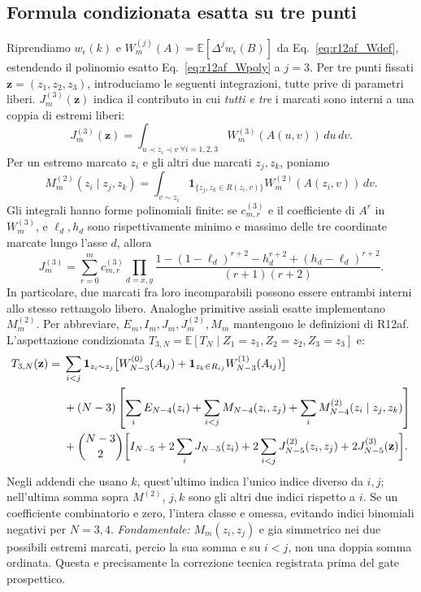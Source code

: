\documentclass[11pt,a4paper]{article}
\begin{document}
\subsection{Formula condizionata esatta su tre punti}

Riprendiamo $w_\epsilon(k)$ e $W_m^{(j)}(A)=\mathbb E[\Delta^jw_\epsilon(B)]$ da Eq.~\eqref{eq:r12af_Wdef}, estendendo il polinomio esatto Eq.~\eqref{eq:r12af_Wpoly} a $j=3$. Per tre punti fissati $\mathbf z=(z_1,z_2,z_3)$, introduciamo le seguenti integrazioni, tutte prive di parametri liberi. $J_m^{(3)}(\mathbf z)$ indica il contributo in cui \emph{tutti e tre} i marcati sono interni a una coppia di estremi liberi:
\begin{equation}
 J_m^{(3)}(\mathbf z)=\int_{u\prec z_i\prec v\ \forall i=1,2,3}
 W_m^{(3)}(A(u,v))\,du\,dv.
 \label{eq:r12ag_J3}
\end{equation}
Per un estremo marcato $z_i$ e gli altri due marcati $z_j,z_k$, poniamo
\begin{equation}
 M_m^{(2)}(z_i\mid z_j,z_k)=\int_{v\sim z_i}\mathbf 1_{\{z_j,z_k\in R(z_i,v)\}}
 W_m^{(2)}(A(z_i,v))\,dv.
 \label{eq:r12ag_M2}
\end{equation}
Gli integrali hanno forme polinomiali finite: se $c_{m,r}^{(3)}$ e il coefficiente di $A^r$ in $W_m^{(3)}$, e $\ell_d,h_d$ sono rispettivamente minimo e massimo delle tre coordinate marcate lungo l'asse $d$, allora
\begin{equation}
 J_m^{(3)}=\sum_{r=0}^{m}c_{m,r}^{(3)}
 \prod_{d=x,y}\frac{1-(1-\ell_d)^{r+2}-h_d^{r+2}+(h_d-\ell_d)^{r+2}}{(r+1)(r+2)}.
 \label{eq:r12ag_J3poly}
\end{equation}
In particolare, due marcati fra loro incomparabili possono essere entrambi interni allo stesso rettangolo libero. Analoghe primitive assiali esatte implementano $M_m^{(2)}$. Per abbreviare, $E_m,I_m,J_m,J_m^{(2)},M_m$ mantengono le definizioni di R12af. L'aspettazione condizionata $T_{3,N}=\mathbb E[T_N\mid Z_1=z_1,Z_2=z_2,Z_3=z_3]$ e:
\begin{align}
T_{3,N}(\mathbf z)={}&\sum_{i<j}\mathbf 1_{z_i\sim z_j}\bigl[
 W_{N-3}^{(0)}(A_{ij})+\mathbf 1_{z_k\in R_{ij}}W_{N-3}^{(1)}(A_{ij})\bigr]\notag\\
&+(N-3)\left[\sum_i E_{N-4}(z_i)+\sum_{i<j}M_{N-4}(z_i,z_j)
+\sum_i M_{N-4}^{(2)}(z_i\mid z_j,z_k)\right]\notag\\
&+\binom{N-3}{2}\biggl[I_{N-5}+2\sum_i J_{N-5}(z_i)
+2\sum_{i<j}J_{N-5}^{(2)}(z_i,z_j)+2J_{N-5}^{(3)}(\mathbf z)\biggr].
\label{eq:r12ag_T3}
\end{align}
Negli addendi che usano $k$, quest'ultimo indica l'unico indice diverso da $i,j$; nell'ultima somma sopra $M^{(2)}$, $j,k$ sono gli altri due indici rispetto a $i$. Se un coefficiente combinatorio e zero, l'intera classe e omessa, evitando indici binomiali negativi per $N=3,4$. \emph{Fondamentale:} $M_m(z_i,z_j)$ e gia simmetrico nei due possibili estremi marcati, percio la sua somma e su $i<j$, non una doppia somma ordinata. Questa e precisamente la correzione tecnica registrata prima del gate prospettico.
\end{document}
